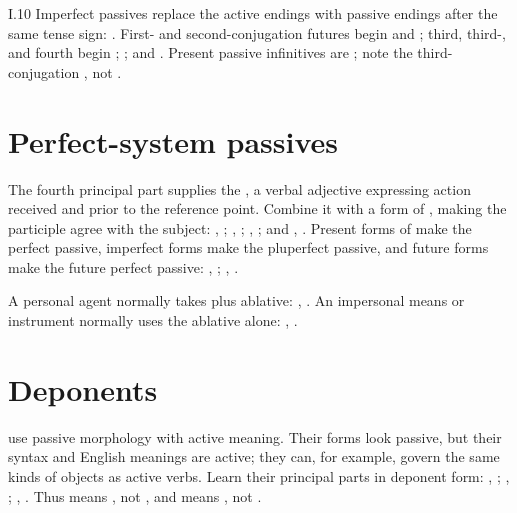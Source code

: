 \begin{courseunit}{I.10}
Imperfect passives replace the active endings with passive endings after the
same tense sign: .
First- and second-conjugation futures begin
 and
; third, third-, and fourth
begin ;
; and
. Present passive infinitives are
; note the third-conjugation
, not .

\section{Perfect-system passives}

The fourth principal part supplies the , a
verbal adjective expressing action received and prior to the reference point.
Combine it
with a form of , making the participle agree with the subject:
, ;
, ;
, ; and
, . Present forms of
 make the perfect passive, imperfect forms make the pluperfect
passive, and future forms make the future perfect passive:
, ;
, .

A personal agent normally takes  plus ablative:
, . An impersonal means or instrument
normally uses the ablative alone: , .

\section{Deponents}

 use passive morphology with active meaning. Their forms
look passive, but their syntax and English meanings are active; they can, for
example, govern the same kinds of objects as active verbs. Learn their
principal parts in deponent form: ,
; , ;
, . Thus
 means , not ,
and  means , not .


\end{courseunit}
